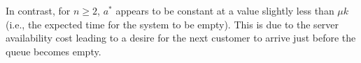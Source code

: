 In contrast, for $n \geq 2$, $a^{*}$ appears to be constant at a value slightly less than $\mu k$ (i.e., the expected time for the system to be empty). This is due to the server availability cost leading to a desire for the next customer to arrive just before the queue becomes empty.


































